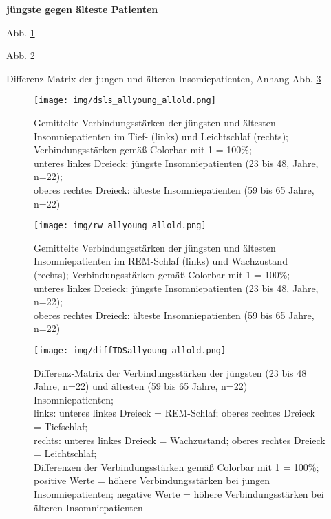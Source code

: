 \textbf{jüngste gegen älteste Patienten}

Abb. \ref{fig:dsls_allyoung_allold}

Abb. \ref{fig:rw_allyoung_allold}

Differenz-Matrix der jungen und älteren Insomiepatienten, Anhang Abb. \ref{fig:diffTDSallyoung_allold}

\begin{figure}[H]
	\centering
	\texttt{[image: img/dsls\_allyoung\_allold.png]}
	\caption[Verbindungsstärken der jüngsten und ältesten Insomniepatienten im Tief- und Leichtschlaf]{Gemittelte Verbindungsstärken der jüngsten und ältesten Insomniepatienten im Tief- (links) und Leichtschlaf (rechts); Verbindungsstärken gemäß Colorbar mit 1 = 100\%;\\unteres linkes Dreieck: jüngste Insomniepatienten (23 bis 48, Jahre, n=22);\\oberes rechtes Dreieck: älteste Insomniepatienten (59 bis 65 Jahre, n=22)}
	\label{fig:dsls_allyoung_allold}
\end{figure}

\begin{figure}[H]
	\centering
	\texttt{[image: img/rw\_allyoung\_allold.png]}
	\caption[Verbindungsstärken der jüngsten und ältesten Insomniepatienten im REM-Schlaf und Wachzustand]{Gemittelte Verbindungsstärken der jüngsten und ältesten Insomniepatienten im REM-Schlaf (links) und Wachzustand (rechts); Verbindungsstärken gemäß Colorbar mit 1 = 100\%;\\unteres linkes Dreieck: jüngste Insomniepatienten (23 bis 48, Jahre, n=22);\\oberes rechtes Dreieck: älteste Insomniepatienten (59 bis 65 Jahre, n=22)}
	\label{fig:rw_allyoung_allold}
\end{figure}

\begin{figure}[H]
	\centering
	\texttt{[image: img/diffTDSallyoung\_allold.png]}
	\caption[Differenz-Matrix der Verbindungsstärken der jungen und älteren Insomniepatienten]{Differenz-Matrix der Verbindungsstärken der jüngsten (23 bis 48 Jahre, n=22) und ältesten (59 bis 65 Jahre, n=22) Insomniepatienten;\\links: unteres linkes Dreieck = REM-Schlaf; oberes rechtes Dreieck = Tiefschlaf;\\rechts: unteres linkes Dreieck = Wachzustand; oberes rechtes Dreieck = Leichtschlaf;\\Differenzen der Verbindungsstärken gemäß Colorbar mit 1 = 100\%;\\positive Werte = höhere Verbindungsstärken bei jungen Insomniepatienten; negative Werte = höhere Verbindungsstärken bei älteren Insomniepatienten}
	\label{fig:diffTDSallyoung_allold}
\end{figure}



